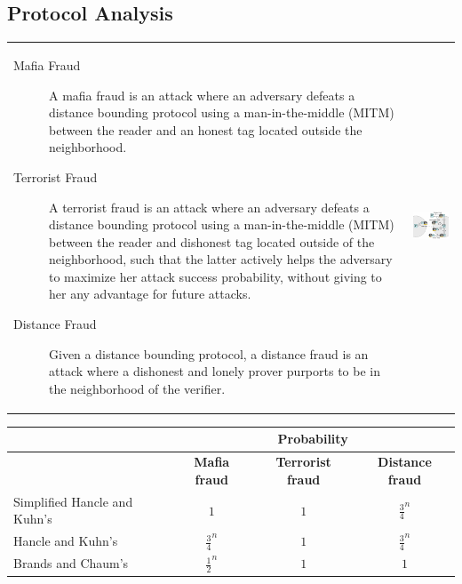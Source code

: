 \subsection{Protocol Analysis}
\begin{tabular}{m{10cm}m{6cm}}
\begin{description}
    \item[Mafia Fraud] A mafia fraud is an attack where an adversary defeats a
    distance bounding protocol using a man-in-the-middle (MITM) between the
    reader and an honest tag located outside the neighborhood.

    \item[Terrorist Fraud] A terrorist fraud is an attack where an
        adversary defeats a distance bounding protocol using a man-in-the-middle (MITM)
    between the reader and dishonest tag located outside of the neighborhood,
    such that the latter actively helps the adversary to maximize her attack
    success probability, without giving to her any advantage for future
    attacks.
    \item[Distance Fraud] Given a distance bounding protocol, a distance fraud
    is an attack where a dishonest and lonely prover purports to be in the
    neighborhood of the verifier.
\end{description}
&
            \includegraphics[width=7cm]{img/att}
            \end{tabular}

\begin{center}
    \begin{tabular}{|l|c|c|c|}
        \hline
        &\multicolumn{3}{c|}{Probability} \\
        \hline
        &\bf Mafia fraud &\bf  Terrorist fraud &\bf  Distance fraud \\
        \hline
        Simplified Hancle and Kuhn's & $1$ & $1$ &$\frac{3}{4}^n$\\
        Hancle and Kuhn's & $\frac{3}{4}^n$& $1$ &$\frac{3}{4}^n$\\
        Brands and Chaum's & $\frac{1}{2}^n$& $1$ &$1$\\
        \hline
    \end{tabular}
\end{center}

